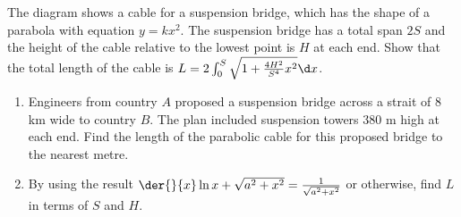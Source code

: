 \begin{problem}
    \begin{center}
    \end{center}

    The diagram shows a cable for a suspension bridge, which has the shape of a parabola with equation $y = kx^2$. The suspension bridge has a total span $2S$ and the height of the cable relative to the lowest point is $H$ at each end. Show that the total length of the cable is $L = 2\int_0^S \sqrt{1 + \frac{4H^2}{S^4} x^2} \d x$.

    \begin{enumerate}
        \item Engineers from country $A$ proposed a suspension bridge across a strait of 8 km wide to country $B$. The plan included suspension towers 380 m high at each end. Find the length of the parabolic cable for this proposed bridge to the nearest metre.
        \item By using the result $\der{}{x} \ln{x + \sqrt{a^2 + x^2}} = \frac1{\sqrt{a^2 + x^2}}$ or otherwise, find $L$ in terms of $S$ and $H$.
    \end{enumerate}
\end{problem}
